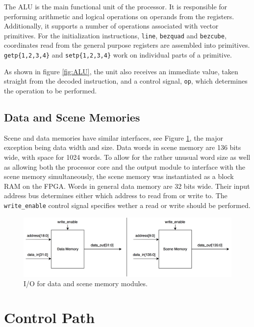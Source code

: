 The ALU is the main functional unit of the processor.
It is responsible for performing arithmetic and logical operations on operands from the registers.
Additionally, it supports a number of operations associated with vector primitives.
For the initialization instructions, \texttt{line}, \texttt{bezquad} and \texttt{bezcube}, coordinates read from the general purpose registers are assembled into primitives.
\texttt{getp\{1,2,3,4\}} and \texttt{setp\{1,2,3,4\}} work on individual parts of a primitive.

As shown in figure \ref{fig:ALU}, the unit also receives an immediate value, taken straight from the decoded instruction, and a control signal, \texttt{op}, which determines the operation to be performed.

\subsection{Data and Scene Memories}

Scene and data memories have similar interfaces, see Figure \ref{fig:data-scene-memories}, the major exception being data width and size.
Data words in scene memory are 136 bits wide, with space for 1024 words.
To allow for the rather unusual word size as well as allowing both the processor core and the output module to interface with the scene memory simultaneously, the scene memory was instantiated as a block RAM on the FPGA.
Words in general data memory are 32 bits wide.
Their input address bus determines either which address to read from or write to.
The \texttt{write\_enable} control signal specifies wether a read or write should be performed.

\begin{figure}[h!]
    \centering
    \includegraphics[width=0.8\linewidth]{images/data-scene-memories.png}
    \caption{I/O for data and scene memory modules.}
    \label{fig:data-scene-memories}
\end{figure}


\section{Control Path}

